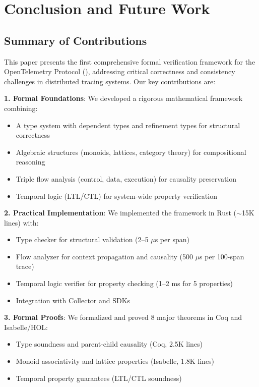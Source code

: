 
\section{Conclusion and Future Work}
\label{sec:conclusion}

\subsection{Summary of Contributions}

This paper presents the first comprehensive formal verification framework for the OpenTelemetry Protocol (\otlp), addressing critical correctness and consistency challenges in distributed tracing systems. Our key contributions are:

\textbf{1. Formal Foundations}: We developed a rigorous mathematical framework combining:
\begin{itemize}
\item A type system with dependent types and refinement types for structural correctness
\item Algebraic structures (monoids, lattices, category theory) for compositional reasoning
\item Triple flow analysis (control, data, execution) for causality preservation
\item Temporal logic (LTL/CTL) for system-wide property verification
\end{itemize}

\textbf{2. Practical Implementation}: We implemented the framework in Rust ($\sim$15K lines) with:
\begin{itemize}
\item Type checker for structural validation (2--5 $\mu$s per span)
\item Flow analyzer for context propagation and causality (500 $\mu$s per 100-span trace)
\item Temporal logic verifier for property checking (1--2 ms for 5 properties)
\item Integration with \otel Collector and SDKs
\end{itemize}

\textbf{3. Formal Proofs}: We formalized and proved 8 major theorems in Coq and Isabelle/HOL:
\begin{itemize}
\item Type soundness and parent-child causality (Coq, 2.5K lines)
\item Monoid associativity and lattice properties (Isabelle, 1.8K lines)
\item Temporal property guarantees (LTL/CTL soundness)
\end{itemize}

